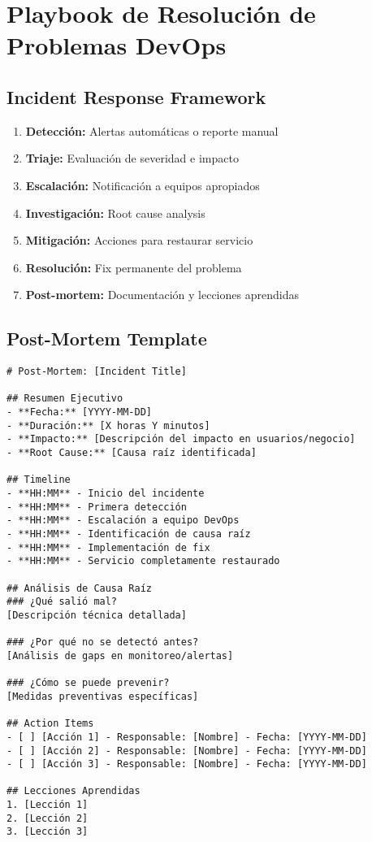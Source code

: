 \documentclass[12pt,a4paper]{article}
\begin{document}
\section{Playbook de Resolución de Problemas DevOps}

\subsection{Incident Response Framework}
\begin{enumerate}
    \item \textbf{Detección:} Alertas automáticas o reporte manual
    \item \textbf{Triaje:} Evaluación de severidad e impacto
    \item \textbf{Escalación:} Notificación a equipos apropiados
    \item \textbf{Investigación:} Root cause analysis
    \item \textbf{Mitigación:} Acciones para restaurar servicio
    \item \textbf{Resolución:} Fix permanente del problema
    \item \textbf{Post-mortem:} Documentación y lecciones aprendidas
\end{enumerate}

\subsection{Post-Mortem Template}
\begin{lstlisting}[caption=Template de Post-Mortem DevOps]
# Post-Mortem: [Incident Title]

## Resumen Ejecutivo
- **Fecha:** [YYYY-MM-DD]
- **Duración:** [X horas Y minutos]
- **Impacto:** [Descripción del impacto en usuarios/negocio]
- **Root Cause:** [Causa raíz identificada]

## Timeline
- **HH:MM** - Inicio del incidente
- **HH:MM** - Primera detección
- **HH:MM** - Escalación a equipo DevOps
- **HH:MM** - Identificación de causa raíz
- **HH:MM** - Implementación de fix
- **HH:MM** - Servicio completamente restaurado

## Análisis de Causa Raíz
### ¿Qué salió mal?
[Descripción técnica detallada]

### ¿Por qué no se detectó antes?
[Análisis de gaps en monitoreo/alertas]

### ¿Cómo se puede prevenir?
[Medidas preventivas específicas]

## Action Items
- [ ] [Acción 1] - Responsable: [Nombre] - Fecha: [YYYY-MM-DD]
- [ ] [Acción 2] - Responsable: [Nombre] - Fecha: [YYYY-MM-DD]
- [ ] [Acción 3] - Responsable: [Nombre] - Fecha: [YYYY-MM-DD]

## Lecciones Aprendidas
1. [Lección 1]
2. [Lección 2]
3. [Lección 3]
\end{lstlisting}
\end{document}

